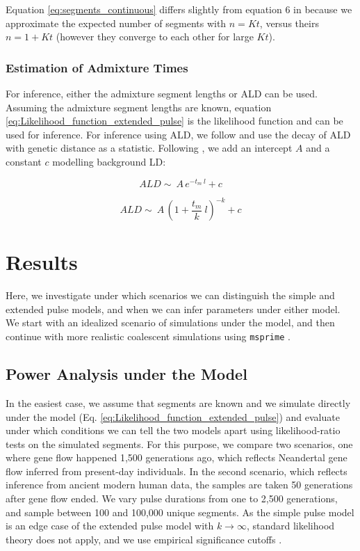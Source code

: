 \documentclass[11pt]{article}
\begin{document}
Equation \ref{eq:segments_continuous} differs slightly from equation 6 in \cite{pool_inference_2009} because we approximate the expected number of segments with $n=Kt$, versus theirs $n=1+Kt$ (however they converge to each other for large $Kt$). 
	

\subsubsection{Estimation of Admixture Times}\label{admixture time estimates}
For inference, either the admixture segment lengths or ALD can be used. Assuming the admixture segment lengths are known, equation \ref{eq:Likelihood_function_extended_pulse} is the likelihood function and can be used for inference. For inference using ALD,  we follow \cite{moorjani_history_2011} and use the decay of ALD with genetic distance as a statistic. Following \cite{moorjani_genetic_2016}, we add an intercept $A$ and a constant $c$ modelling background LD:

\begin{equation}
\label{eq:simple_pulse_tail_inf}
ALD \sim\ A\,e^{-t_m \:l}+c
\end{equation}

\begin{equation}
\label{eq:extended_pulse_tail_inf}
ALD \sim\ A\,\left( 1 + \frac{t_m}{k} \:l\right) ^{-k}+c
\end{equation}

\section{Results}\label{results}

Here, we investigate under which scenarios we can distinguish the simple and extended pulse models, and when we can infer parameters under either model. 
We start with an idealized scenario of simulations under the model, and then continue with more realistic coalescent simulations using \texttt{msprime} \citep{kelleher_efficient_2016}. 

\subsection{Power Analysis under the Model}\label{Power Analysis}
In the easiest case, we assume that segments are  known and we simulate directly under the model (Eq. \ref{eq:Likelihood_function_extended_pulse}) and evaluate under which conditions we can tell the two models apart using likelihood-ratio tests on the simulated segments. For this purpose, we compare two scenarios, one where gene flow happened 1,500 generations ago, which reflects Neandertal gene flow inferred from present-day individuals. In the second scenario, which reflects inference from ancient modern human data, the samples are taken 50 generations after gene flow ended. We vary pulse durations from one to 2,500 generations, and sample between 100 and 100,000 unique segments. As the simple pulse model is an edge case of the extended pulse model with $k\to \infty$, standard likelihood theory does not apply, and we use empirical significance cutoffs \citep{Kozubowski_Testing_2008}.
\end{document}
